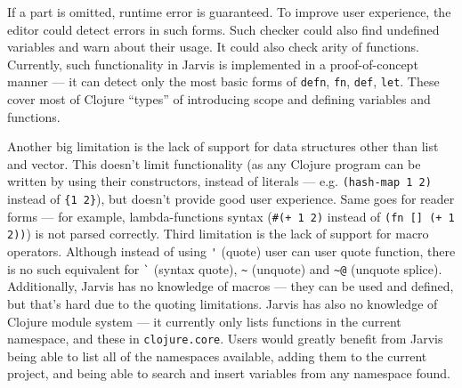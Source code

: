 \documentclass[11pt]{scrartcl}
\begin{document}
If a part is omitted, runtime error is guaranteed.
To improve user experience, the editor could detect errors in such forms.
Such checker could also find undefined variables and warn about their usage.
It could also check arity of functions.
Currently, such functionality in Jarvis is implemented in a proof-of-concept
manner --- it can detect only the most basic forms of \lstinline|defn|,
\lstinline|fn|, \lstinline|def|, \lstinline|let|. These cover most of Clojure
“types” of introducing scope and defining variables and functions.

Another big limitation is the lack of support for data structures other than
list and vector.
This doesn’t limit functionality (as any Clojure program can be written by using
their constructors, instead of literals --- e.g. \lstinline|(hash-map 1 2)|
instead of \lstinline|{1 2}|),
but doesn’t provide good user experience.
Same goes for reader forms --- for example, lambda-functions syntax
(\lstinline|#(+ 1 2)|
instead of \lstinline|(fn [] (+ 1 2))|) is not parsed correctly.
Third limitation is the lack of support for macro operators.
Although instead of using \lstinline|'| (quote) user can user quote function, there is no
such equivalent for \lstinline|`| (syntax quote), \lstinline|~| (unquote) and
\lstinline|~@| (unquote splice).
Additionally, Jarvis has no knowledge of macros --- they can be used and defined,
but that’s hard due to the quoting limitations.
Jarvis has also no knowledge of Clojure module system --- it currently only lists
functions in the current namespace, and these in \lstinline|clojure.core|.
Users would greatly benefit from Jarvis being able to list all of the namespaces
available, adding them to the current project, and being able to search and
insert variables from any namespace found.
\end{document}
